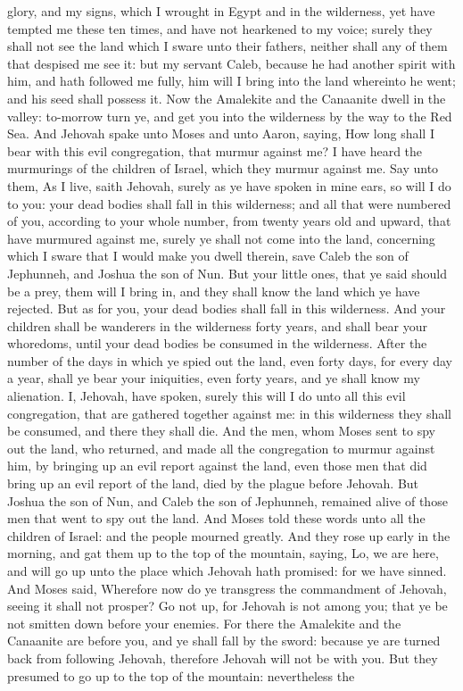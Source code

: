 glory, and my signs, which I wrought in Egypt and in the wilderness, yet have tempted me these ten times, and have not hearkened to my voice; surely they shall not see the land which I sware unto their fathers, neither shall any of them that despised me see it: but my servant Caleb, because he had another spirit with him, and hath followed me fully, him will I bring into the land whereinto he went; and his seed shall possess it. Now the Amalekite and the Canaanite dwell in the valley: to-morrow turn ye, and get you into the wilderness by the way to the Red Sea.  And Jehovah spake unto Moses and unto Aaron, saying, How long shall I bear with this evil congregation, that murmur against me? I have heard the murmurings of the children of Israel, which they murmur against me. Say unto them, As I live, saith Jehovah, surely as ye have spoken in mine ears, so will I do to you: your dead bodies shall fall in this wilderness; and all that were numbered of you, according to your whole number, from twenty years old and upward, that have murmured against me, surely ye shall not come into the land, concerning which I sware that I would make you dwell therein, save Caleb the son of Jephunneh, and Joshua the son of Nun. But your little ones, that ye said should be a prey, them will I bring in, and they shall know the land which ye have rejected. But as for you, your dead bodies shall fall in this wilderness. And your children shall be wanderers in the wilderness forty years, and shall bear your whoredoms, until your dead bodies be consumed in the wilderness. After the number of the days in which ye spied out the land, even forty days, for every day a year, shall ye bear your iniquities, even forty years, and ye shall know my alienation. I, Jehovah, have spoken, surely this will I do unto all this evil congregation, that are gathered together against me: in this wilderness they shall be consumed, and there they shall die.  And the men, whom Moses sent to spy out the land, who returned, and made all the congregation to murmur against him, by bringing up an evil report against the land, even those men that did bring up an evil report of the land, died by the plague before Jehovah. But Joshua the son of Nun, and Caleb the son of Jephunneh, remained alive of those men that went to spy out the land.  And Moses told these words unto all the children of Israel: and the people mourned greatly. And they rose up early in the morning, and gat them up to the top of the mountain, saying, Lo, we are here, and will go up unto the place which Jehovah hath promised: for we have sinned. And Moses said, Wherefore now do ye transgress the commandment of Jehovah, seeing it shall not prosper? Go not up, for Jehovah is not among you; that ye be not smitten down before your enemies. For there the Amalekite and the Canaanite are before you, and ye shall fall by the sword: because ye are turned back from following Jehovah, therefore Jehovah will not be with you. But they presumed to go up to the top of the mountain: nevertheless the 